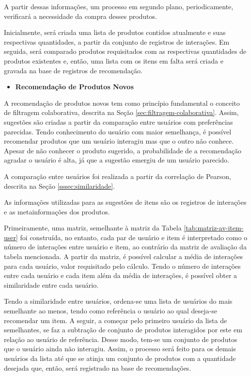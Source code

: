 A partir dessas informações, um processo em segundo plano, periodicamente, verificará a necessidade da compra desses produtos.

Inicialmente, será criada uma lista de produtos contidos atualmente e suas respectivas quantidades, a partir da conjunto de registros de interações. Em seguida, será comparado produtos requisitados com as respectivas quantidades de produtos existentes e, então, uma lista com os itens em falta será criada e gravada na base de registros de recomendação.

\begin{itemize}
    \item \textbf{Recomendação de Produtos Novos}
\end{itemize}

A recomendação de produtos novos tem como princípio fundamental o conceito de filtragem colaborativa, descrita na Seção \ref{sec:filtragem-colaborativa}. Assim, sugestões são criadas a partir da comparação entre usuários com preferências parecidas. Tendo conhecimento do usuário com maior semelhança, é possível recomendar produtos que um usuário interagiu mas que o outro não conhece. Apesar de não conhecer o produto sugerido, a probabilidade de a recomendação agradar o usuário é alta, já que a sugestão emergiu de um usuário parecido.

A comparação entre usuários foi realizada a partir da correlação de Pearson, descrita na Seção \ref{sssec:similaridade}.

As informações utilizadas para as sugestões de itens são os registros de interações e as metainformações dos produtos. 

Primeiramente, uma matriz, semelhante à matriz da Tabela \ref{tab:matriz-av-item-user} foi construída, no entanto, cada par de usuário e item é interpretado como o número de interações entre usuário e item, ao contrário da matriz de avaliação da tabela mencionada. A partir da matriz, é possível calcular a média de interações para cada usuário, valor requisitado pelo cálculo. Tendo o número de interações entre cada usuário e cada item além da média de interações, é possível obter a similaridade entre cada usuário.

Tendo a similaridade entre usuários, ordena-se uma lista de usuários do mais semelhante ao menos, tendo como referência o usuário ao qual deseja-se recomendar um item. A seguir, a começar pelo primeiro usuário da lista de semelhantes, se faz a subtração de conjunto de produtos interagidos por este em relação ao usuário de referência. Desse modo, tem-se um conjunto de produtos que o usuário ainda não interagiu. Assim, o processo será feito para os demais usuários da lista até que se atinja um conjunto de produtos com a quantidade desejada que, então, será registrado na base de recomendações.

